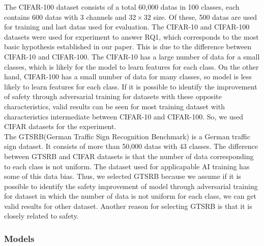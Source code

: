 \documentclass[journal,article,submit,moreauthors,pdftex]{Definitions/mdpi}
\begin{document}
The CIFAR-100 dataset consists of a total 60,000 datas in 100 classes, each contains 600 datas with 3 channels and \begin{math}{32\times 32}\end{math} size. Of these, 500 datas are used for training and last datas used for evaluation.
The CIFAR-10 and CIFAR-100 datasets were used for experiment to answer RQ1, which corresponds to the most basic hypothesis established in our paper.
This is due to the difference between CIFAR-10 and CIFAR-100. The CIFAR-10 has a large number of data for a small classes, which is likely for the model to learn features for each class. On the other hand, CIFAR-100 has a small number of data for many classes, so model is less likely to learn features for each class.
If it is possible to identify the improvement of safety through adversarial training for datasets with these opposite characteristics, valid results can be seen for most training dataset with characteristics intermediate between CIFAR-10 and CIFAR-100. So, we used CIFAR datasets for the experiment. \\

The GTSRB(German Traffic Sign Recognition Benchmark) is a German traffic sign dataset. It consists of more than 50,000 datas with 43 classes.
The difference between GTSRB and CIFAR datasets is that the number of data corresponding to each class is not uniform.
The dataset used for applicapable AI training has some of this data bias.
Thus, we selected GTSRB because we assume if it is possible to identify the safety improvement of model through adversarial training for dataset in which the number of data is not uniform for each class, we can get valid results for other dataset.
Another reason for selecting GTSRB is that it is closely related to safety.

\subsubsection{Models}
\end{document}
